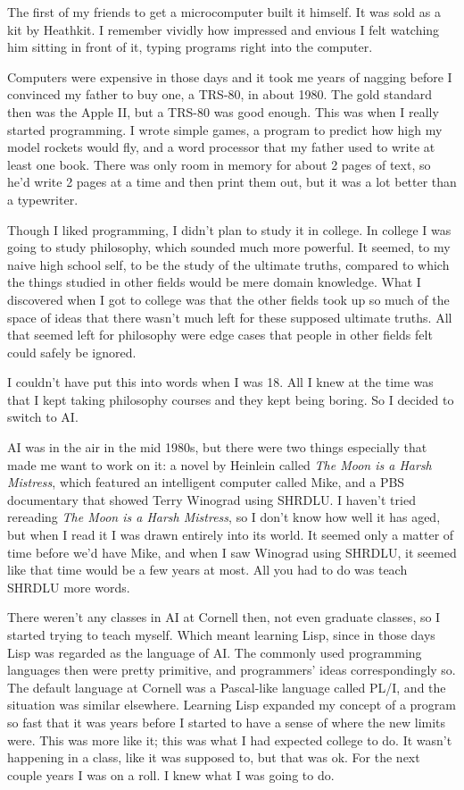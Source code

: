 \documentclass[12pt]{book}
\begin{document}
The first of my friends to get a microcomputer built it himself. It was
sold as a kit by Heathkit. I remember vividly how impressed and envious
I felt watching him sitting in front of it, typing programs right into
the computer.

Computers were expensive in those days and it took me years of nagging
before I convinced my father to buy one, a TRS-80, in about 1980. The
gold standard then was the Apple II, but a TRS-80 was good enough. This
was when I really started programming. I wrote simple games, a program
to predict how high my model rockets would fly, and a word processor
that my father used to write at least one book. There was only room in
memory for about 2 pages of text, so he'd write 2 pages at a time and
then print them out, but it was a lot better than a typewriter.

Though I liked programming, I didn't plan to study it in college. In
college I was going to study philosophy, which sounded much more
powerful. It seemed, to my naive high school self, to be the study of
the ultimate truths, compared to which the things studied in other
fields would be mere domain knowledge. What I discovered when I got to
college was that the other fields took up so much of the space of ideas
that there wasn't much left for these supposed ultimate truths. All that
seemed left for philosophy were edge cases that people in other fields
felt could safely be ignored.

I couldn't have put this into words when I was 18. All I knew at the
time was that I kept taking philosophy courses and they kept being
boring. So I decided to switch to AI.

AI was in the air in the mid 1980s, but there were two things especially
that made me want to work on it: a novel by Heinlein called \emph{The
Moon is a Harsh Mistress}, which featured an intelligent computer called
Mike, and a PBS documentary that showed Terry Winograd using SHRDLU. I
haven't tried rereading \emph{The Moon is a Harsh Mistress}, so I don't
know how well it has aged, but when I read it I was drawn entirely into
its world. It seemed only a matter of time before we'd have Mike, and
when I saw Winograd using SHRDLU, it seemed like that time would be a
few years at most. All you had to do was teach SHRDLU more words.

There weren't any classes in AI at Cornell then, not even graduate
classes, so I started trying to teach myself. Which meant learning Lisp,
since in those days Lisp was regarded as the language of AI. The
commonly used programming languages then were pretty primitive, and
programmers' ideas correspondingly so. The default language at Cornell
was a Pascal-like language called PL/I, and the situation was similar
elsewhere. Learning Lisp expanded my concept of a program so fast that
it was years before I started to have a sense of where the new limits
were. This was more like it; this was what I had expected college to do.
It wasn't happening in a class, like it was supposed to, but that was
ok. For the next couple years I was on a roll. I knew what I was going
to do.
\end{document}
